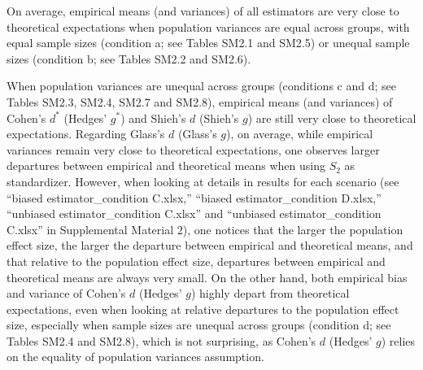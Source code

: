 \documentclass[
  english,
  man,mask,floatsintext]{apa6}
\begin{document}
On average, empirical means (and variances) of all estimators are very close to theoretical expectations when population variances are equal across groups, with equal sample sizes (condition a; see Tables SM2.1 and SM2.5) or unequal sample sizes (condition b; see Tables SM2.2 and SM2.6).

When population variances are unequal across groups (conditions c and d; see Tables SM2.3, SM2.4, SM2.7 and SM2.8), empirical means (and variances) of Cohen's \(d^*\) (Hedges' \(g^*\)) and Shieh's \(d\) (Shieh's \(g\)) are still very close to theoretical expectations. Regarding Glass's \(d\) (Glass's \(g\)), on average, while empirical variances remain very close to theoretical expectations, one observes larger departures between empirical and theoretical means when using \(S_2\) as standardizer. However, when looking at details in results for each scenario (see ``biased estimator\_condition C.xlsx,'' ``biased estimator\_condition D.xlsx,'' ``unbiased estimator\_condition C.xlsx'' and ``unbiased estimator\_condition C.xlsx'' in Supplemental Material 2), one notices that the larger the population effect size, the larger the departure between empirical and theoretical means, and that relative to the population effect size, departures between empirical and theoretical means are always very small. On the other hand, both empirical bias and variance of Cohen's \(d\) (Hedges' \(g\)) highly depart from theoretical expectations, even when looking at relative departures to the population effect size, especially when sample sizes are unequal across groups (condition d; see Tables SM2.4 and SM2.8), which is not surprising, as Cohen's \(d\) (Hedges' \(g\)) relies on the equality of population variances assumption.
\end{document}
